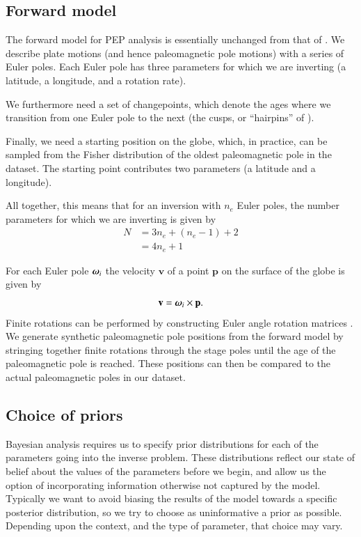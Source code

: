 \documentclass[preprint,12pt,authoryear]{elsarticle}
\newcommand{\mitbf}[1]{\hbox{\mathversion{bold}$#1$}}
\begin{document}
\subsection{Forward model}
\label{sec:forward_model}
The forward model for PEP analysis is essentially unchanged from that of \citet{gordon1984paleomagnetic}.
We describe plate motions (and hence paleomagnetic pole motions) with a series of Euler poles.
Each Euler pole has three parameters for which we are inverting (a latitude, a longitude, and a rotation rate).

We furthermore need a set of changepoints, which denote the ages where we transition from 
one Euler pole to the next (the cusps, or ``hairpins'' of \citet{irving1972hairpins}).

Finally, we need a starting position on the globe, which, in practice, can be sampled
from the Fisher distribution of the oldest paleomagnetic pole in the dataset.
The starting point contributes two parameters (a latitude and a longitude).

All together, this means that for an inversion with $n_e$ Euler poles, 
the number parameters for which we are inverting is given by
\begin{equation}
\begin{aligned}
N &= 3 n_e + (n_e -1) + 2 \\
 &= 4 n_e + 1
\end{aligned}
\label{eq:n_parameters}
\end{equation}

For each Euler pole $\mitbf{\omega}_i$ the velocity $\mathbf{v}$ of a point 
$\mathbf{p}$ on the surface of the globe is given by
\begin{equation}
\mathbf{v} = \mitbf{\omega}_i \times \mathbf{p}.
\label{eq:rigid_rotation}
\end{equation}
Finite rotations can be performed by constructing Euler angle rotation matrices \citep[cf.][]{goldstein1965classical}. 
We generate synthetic paleomagnetic pole positions from the forward model by stringing together
finite rotations through the stage poles until the age of the paleomagnetic pole
is reached. These positions can then be compared to the actual paleomagnetic poles in our dataset.

\subsection{Choice of priors}

Bayesian analysis requires us to specify prior distributions for each of the parameters going into the inverse problem.
These distributions reflect our state of belief about the values of the parameters before we begin,
and allow us the option of incorporating information otherwise not captured by the model.
Typically we want to avoid biasing the results of the model towards a specific posterior distribution,
so we try to choose as uninformative a prior as possible. Depending upon the context, and the type
of parameter, that choice may vary.
\end{document}
